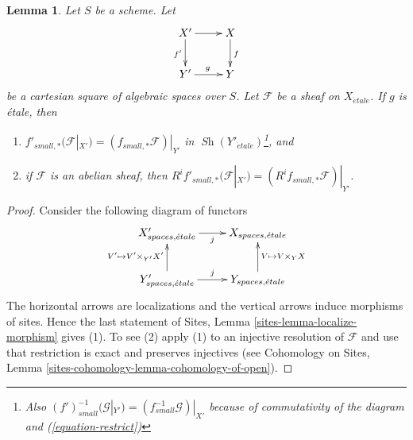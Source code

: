 \documentclass[10pt,a4paper]{amsart}
\theoremstyle{plain}
\newtheorem{lemma}[subsection]{Lemma}
\theoremstyle{definition}
\theoremstyle{remark}
\numberwithin{equation}{subsection}
\def\Sh{\mathop{\mathit{Sh}}\nolimits}
\def\etale{{\acute{e}tale}}
\begin{document}
\begin{lemma}
\label{lemma-pushforward-etale-base-change}
Let $S$ be a scheme. Let
$$
\xymatrix{
X' \ar[r] \ar[d]_{f'} & X \ar[d]^f \\
Y' \ar[r]^g & Y
}
$$
be a cartesian square of algebraic spaces over $S$. Let
$\mathcal{F}$ be a sheaf on $X_\etale$. If $g$ is \'etale, then
\begin{enumerate}
\item $f'_{small, *}(\mathcal{F}|_{X'}) = (f_{small, *}\mathcal{F})|_{Y'}$
in $\Sh(Y'_\etale)$\footnote{Also
$(f')_{small}^{-1}(\mathcal{G}|_{Y'}) = (f_{small}^{-1}\mathcal{G})|_{X'}$
because of commutativity of the diagram and (\ref{equation-restrict})}, and
\item if $\mathcal{F}$ is an abelian sheaf, then
$R^if'_{small, *}(\mathcal{F}|_{X'}) = (R^if_{small, *}\mathcal{F})|_{Y'}$.
\end{enumerate}
\end{lemma}

\begin{proof}
Consider the following diagram of functors
$$
\xymatrix{
X'_{spaces, \etale} \ar[r]_j &
X_{spaces, \etale} \\
Y'_{spaces, \etale} \ar[r]^j \ar[u]^{V' \mapsto V' \times_{Y'} X'} &
Y_{spaces, \etale} \ar[u]_{V \mapsto V \times_Y X}
}
$$
The horizontal arrows are localizations and the vertical arrows induce
morphisms of sites. Hence the last statement of
Sites, Lemma \ref{sites-lemma-localize-morphism}
gives (1). To see (2) apply (1) to an injective resolution of $\mathcal{F}$
and use that restriction is exact and preserves injectives (see
Cohomology on Sites, Lemma \ref{sites-cohomology-lemma-cohomology-of-open}).
\end{proof}
\end{document}
